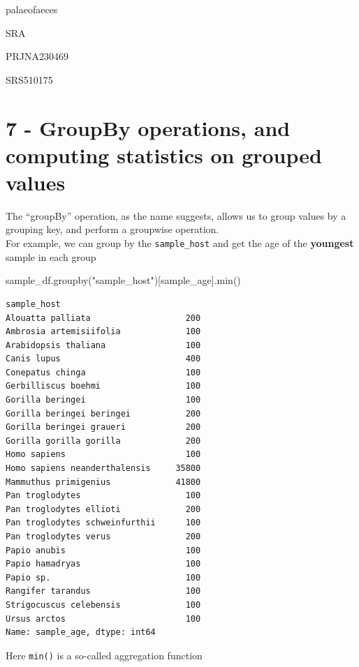\documentclass[
  letterpaper,
]{book}
\newenvironment{Shaded}{}{}
\newcommand{\BuiltInTok}[1]{\textcolor[rgb]{0.84,0.23,0.29}{#1}}
\newcommand{\NormalTok}[1]{\textcolor[rgb]{0.14,0.16,0.18}{#1}}
\newcommand{\StringTok}[1]{\textcolor[rgb]{0.01,0.18,0.38}{#1}}
\begin{document}
palaeofaeces

SRA

PRJNA230469

SRS510175

\hypertarget{groupby-operations-and-computing-statistics-on-grouped-values}{%
\section{7 - GroupBy operations, and computing statistics on grouped
values}\label{groupby-operations-and-computing-statistics-on-grouped-values}}

The ``groupBy'' operation, as the name suggests, allows us to group
values by a grouping key, and perform a groupwise operation.\\
For example, we can group by the \texttt{sample\_host} and get the age
of the \textbf{youngest} sample in each group

\begin{Shaded}
\begin{Highlighting}[]
\NormalTok{sample\_df.groupby(}\StringTok{"sample\_host"}\NormalTok{)[}\StringTok{\textquotesingle{}sample\_age\textquotesingle{}}\NormalTok{].}\BuiltInTok{min}\NormalTok{()}
\end{Highlighting}
\end{Shaded}

\begin{verbatim}
sample_host
Alouatta palliata                   200
Ambrosia artemisiifolia             100
Arabidopsis thaliana                100
Canis lupus                         400
Conepatus chinga                    100
Gerbilliscus boehmi                 100
Gorilla beringei                    100
Gorilla beringei beringei           200
Gorilla beringei graueri            200
Gorilla gorilla gorilla             200
Homo sapiens                        100
Homo sapiens neanderthalensis     35800
Mammuthus primigenius             41800
Pan troglodytes                     100
Pan troglodytes ellioti             200
Pan troglodytes schweinfurthii      100
Pan troglodytes verus               200
Papio anubis                        100
Papio hamadryas                     100
Papio sp.                           100
Rangifer tarandus                   100
Strigocuscus celebensis             100
Ursus arctos                        100
Name: sample_age, dtype: int64
\end{verbatim}

Here \texttt{min()} is a so-called aggregation function
\end{document}

